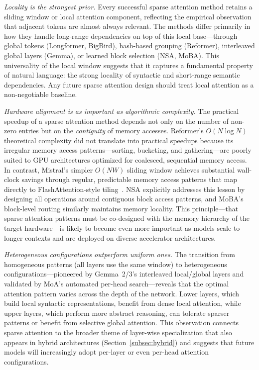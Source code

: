 \emph{Locality is the strongest prior.} Every successful sparse attention method retains a sliding window or local attention component, reflecting the empirical observation that adjacent tokens are almost always relevant. The methods differ primarily in how they handle long-range dependencies on top of this local base---through global tokens (Longformer, BigBird), hash-based grouping (Reformer), interleaved global layers (Gemma), or learned block selection (NSA, MoBA). This universality of the local window suggests that it captures a fundamental property of natural language: the strong locality of syntactic and short-range semantic dependencies. Any future sparse attention design should treat local attention as a non-negotiable baseline.

\emph{Hardware alignment is as important as algorithmic complexity.} The practical speedup of a sparse attention method depends not only on the number of non-zero entries but on the \emph{contiguity} of memory accesses. Reformer's $O(N \log N)$ theoretical complexity did not translate into practical speedups because its irregular memory access patterns---sorting, bucketing, and gathering---are poorly suited to GPU architectures optimized for coalesced, sequential memory access. In contrast, Mistral's simpler $O(NW)$ sliding window achieves substantial wall-clock savings through regular, predictable memory access patterns that map directly to FlashAttention-style tiling~\cite{dao2022flashattention}. NSA explicitly addresses this lesson by designing all operations around contiguous block access patterns, and MoBA's block-level routing similarly maintains memory locality. This principle---that sparse attention patterns must be co-designed with the memory hierarchy of the target hardware---is likely to become even more important as models scale to longer contexts and are deployed on diverse accelerator architectures.

\emph{Heterogeneous configurations outperform uniform ones.} The transition from homogeneous patterns (all layers use the same window) to heterogeneous configurations---pioneered by Gemma~2/3's interleaved local/global layers and validated by MoA's automated per-head search---reveals that the optimal attention pattern varies across the depth of the network. Lower layers, which build local syntactic representations, benefit from dense local attention, while upper layers, which perform more abstract reasoning, can tolerate sparser patterns or benefit from selective global attention. This observation connects sparse attention to the broader theme of layer-wise specialization that also appears in hybrid architectures (Section~\ref{subsec:hybrid}) and suggests that future models will increasingly adopt per-layer or even per-head attention configurations.

